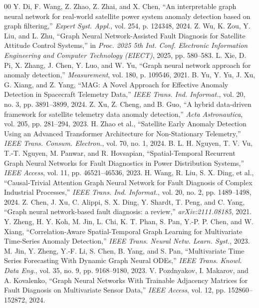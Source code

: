 \documentclass[conference]{IEEEtran}
\begin{document}
\enlargethispage{110pt}
{\small
\begin{thebibliography}{00}
 Y. Di, F. Wang, Z. Zhao, Z. Zhai, and X. Chen, ``An interpretable graph neural network for real-world satellite power system anomaly detection based on graph filtering,'' \textit{Expert Syst. Appl.}, vol. 254, p. 124348, 2024.
 Z. Wu, K. Zou, Y. Liu, and L. Zhu, ``Graph Neural Network-Assisted Fault Diagnosis for Satellite Attitude Control Systems,'' in \textit{Proc. 2025 5th Int. Conf. Electronic Information Engineering and Computer Technology (EIECT)}, 2025, pp. 580--583.
 L. Xie, D. Pi, X. Zhang, J. Chen, Y. Luo, and W. Yu, ``Graph neural network approach for anomaly detection,'' \textit{Measurement}, vol. 180, p. 109546, 2021.
 B. Yu, Y. Yu, J. Xu, G. Xiang, and Z. Yang, ``MAG: A Novel Approach for Effective Anomaly Detection in Spacecraft Telemetry Data,'' \textit{IEEE Trans. Ind. Informat.}, vol. 20, no. 3, pp. 3891--3899, 2024.
 Z. Xu, Z. Cheng, and B. Guo, ``A hybrid data-driven framework for satellite telemetry data anomaly detection,'' \textit{Acta Astronautica}, vol. 205, pp. 281--294, 2023.
 H. Zhao et al., ``Satellite Early Anomaly Detection Using an Advanced Transformer Architecture for Non-Stationary Telemetry,'' \textit{IEEE Trans. Consum. Electron.}, vol. 70, no. 1, 2024.
 B. L. H. Nguyen, T. V. Vu, T.-T. Nguyen, M. Panwar, and R. Hovsapian, ``Spatial-Temporal Recurrent Graph Neural Networks for Fault Diagnostics in Power Distribution Systems,'' \textit{IEEE Access}, vol. 11, pp. 46521--46536, 2023.
 H. Wang, R. Liu, S. X. Ding, et al., ``Causal-Trivial Attention Graph Neural Network for Fault Diagnosis of Complex Industrial Processes,'' \textit{IEEE Trans. Ind. Informat.}, vol. 20, no. 2, pp. 1489--1498, 2024.
 Z. Chen, J. Xu, C. Alippi, S. X. Ding, Y. Shardt, T. Peng, and C. Yang, ``Graph neural network-based fault diagnosis: a review,'' \textit{arXiv:2111.08185}, 2021.
 Y. Zheng, H. Y. Koh, M. Jin, L. Chi, K. T. Phan, S. Pan, Y.-P. P. Chen, and W. Xiang, ``Correlation-Aware Spatial-Temporal Graph Learning for Multivariate Time-Series Anomaly Detection,'' \textit{IEEE Trans. Neural Netw. Learn. Syst.}, 2023.
 M. Jin, Y. Zheng, Y.-F. Li, S. Chen, B. Yang, and S. Pan, ``Multivariate Time Series Forecasting With Dynamic Graph Neural ODEs,'' \textit{IEEE Trans. Knowl. Data Eng.}, vol. 35, no. 9, pp. 9168--9180, 2023.
 V. Pozdnyakov, I. Makarov, and A. Kovalenko, ``Graph Neural Networks With Trainable Adjacency Matrices for Fault Diagnosis on Multivariate Sensor Data,'' \textit{IEEE Access}, vol. 12, pp. 152860--152872, 2024.

\end{thebibliography}}
\end{document}
